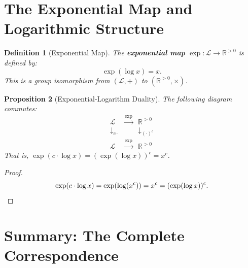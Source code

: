 \documentclass[11pt]{article}
\newtheorem{definition}{Definition}[section]
\newtheorem{proposition}[definition]{Proposition}
\begin{document}
\section{The Exponential Map and Logarithmic Structure}
\label{sec:exponential}

\begin{definition}[Exponential Map]
The \textbf{exponential map} $\exp: \mathcal{L} \to \mathbb{R}^{>0}$ is defined by:
\[
\exp(\log x) = x.
\]
This is a group isomorphism from $(\mathcal{L}, +)$ to $(\mathbb{R}^{>0}, \times)$.
\end{definition}

\begin{proposition}[Exponential-Logarithm Duality]
The following diagram commutes:
\[
\begin{array}{ccc}
\mathcal{L} & \xrightarrow{\exp} & \mathbb{R}^{>0} \\
\downarrow_{c \cdot} & & \downarrow_{(\cdot)^c} \\
\mathcal{L} & \xrightarrow{\exp} & \mathbb{R}^{>0}
\end{array}
\]
That is, $\exp(c \cdot \log x) = (\exp(\log x))^c = x^c$.
\end{proposition}

\begin{proof}
\[
\exp(c \cdot \log x) = \exp(\log(x^c)) = x^c = (\exp(\log x))^c. \qedhere
\]
\end{proof}

\section{Summary: The Complete Correspondence}
\label{sec:summary}
\end{document}
